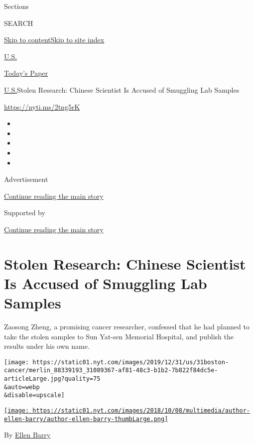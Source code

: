 Sections

SEARCH

\protect\hyperlink{site-content}{Skip to
content}\protect\hyperlink{site-index}{Skip to site index}

\href{https://www.nytimes.com/section/us}{U.S.}

\href{https://myaccount.nytimes.com/auth/login?response_type=cookie\&client_id=vi}{}

\href{https://www.nytimes.com/section/todayspaper}{Today's Paper}

\href{/section/us}{U.S.}\textbar{}Stolen Research: Chinese Scientist Is
Accused of Smuggling Lab Samples

\url{https://nyti.ms/2tng5rK}

\begin{itemize}
\item
\item
\item
\item
\item
\end{itemize}

Advertisement

\protect\hyperlink{after-top}{Continue reading the main story}

Supported by

\protect\hyperlink{after-sponsor}{Continue reading the main story}

\hypertarget{stolen-research-chinese-scientist-is-accused-of-smuggling-lab-samples}{%
\section{Stolen Research: Chinese Scientist Is Accused of Smuggling Lab
Samples}\label{stolen-research-chinese-scientist-is-accused-of-smuggling-lab-samples}}

Zaosong Zheng, a promising cancer researcher, confessed that he had
planned to take the stolen samples to Sun Yat-sen Memorial Hospital, and
publish the results under his own name.

\texttt{[image: https://static01.nyt.com/images/2019/12/31/us/31boston-cancer/merlin\_88339193\_31089367-af81-48c3-b1b2-7b822f84dc5e-articleLarge.jpg?quality=75\\\&auto=webp\\\&disable=upscale]}

\href{https://www.nytimes.com/by/ellen-barry}{\texttt{[image: https://static01.nyt.com/images/2018/10/08/multimedia/author-ellen-barry/author-ellen-barry-thumbLarge.png]}}

By \href{https://www.nytimes.com/by/ellen-barry}{Ellen Barry}

